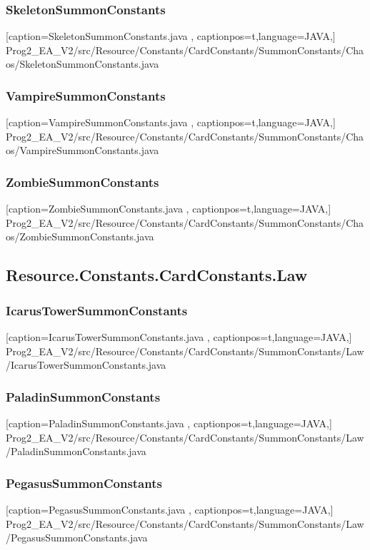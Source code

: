 \documentclass[a4paper,12pt]{scrartcl}
\begin{document}
	\subsubsection{SkeletonSummonConstants}
	
	[caption={SkeletonSummonConstants.java}
	\label{lst:javaclass},
	captionpos=t,language=JAVA,]
	{Prog2_EA_V2/src/Resource/Constants/CardConstants/SummonConstants/Chaos/SkeletonSummonConstants.java}
	\subsubsection{VampireSummonConstants}
	
	[caption={VampireSummonConstants.java}
	\label{lst:javaclass},
	captionpos=t,language=JAVA,]
	{Prog2_EA_V2/src/Resource/Constants/CardConstants/SummonConstants/Chaos/VampireSummonConstants.java}
	\subsubsection{ZombieSummonConstants}
	
	[caption={ZombieSummonConstants.java}
	\label{lst:javaclass},
	captionpos=t,language=JAVA,]
	{Prog2_EA_V2/src/Resource/Constants/CardConstants/SummonConstants/Chaos/ZombieSummonConstants.java}
	\subsection{Resource.Constants.CardConstants.Law}
	\subsubsection{IcarusTowerSummonConstants}
	
	[caption={IcarusTowerSummonConstants.java}
	\label{lst:javaclass},
	captionpos=t,language=JAVA,]
	{Prog2_EA_V2/src/Resource/Constants/CardConstants/SummonConstants/Law/IcarusTowerSummonConstants.java}
	\subsubsection{PaladinSummonConstants}
	
	[caption={PaladinSummonConstants.java}
	\label{lst:javaclass},
	captionpos=t,language=JAVA,]
	{Prog2_EA_V2/src/Resource/Constants/CardConstants/SummonConstants/Law/PaladinSummonConstants.java}
	\subsubsection{PegasusSummonConstants}
	
	[caption={PegasusSummonConstants.java}
	\label{lst:javaclass},
	captionpos=t,language=JAVA,]
	{Prog2_EA_V2/src/Resource/Constants/CardConstants/SummonConstants/Law/PegasusSummonConstants.java}
\end{document}
